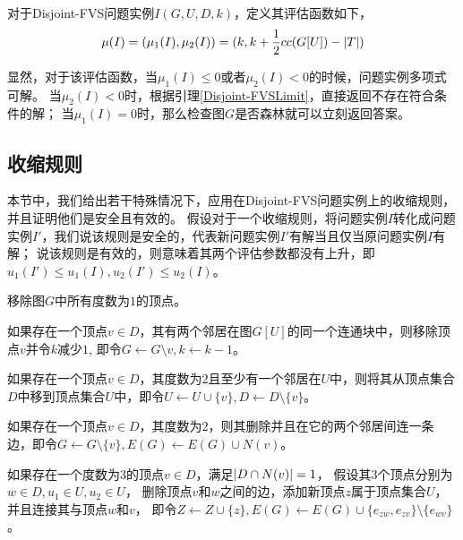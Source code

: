 \begin{definition}
对于Disjoint-FVS问题实例$I(G, U, D, k)$，定义其评估函数如下，
\[\mu(I) = (\mu_1(I), \mu_2(I)) = (k, k + \frac{1}{2}cc(G[U]) - \left\vert T \right\vert)\]
\end{definition}

显然，对于该评估函数，当$\mu_1(I) \le  0$或者$\mu_2(I) < 0$的时候，问题实例多项式可解。
当$\mu_2(I) < 0$时，根据引理\ref{Disjoint-FVSLimit}，直接返回不存在符合条件的解；
当$\mu_1(I) = 0$时，那么检查图$G$是否森林就可以立刻返回答案。

\subsection{收缩规则}
本节中，我们给出若干特殊情况下，应用在Disjoint-FVS问题实例上的收缩规则，并且证明他们是安全且有效的。
假设对于一个收缩规则，将问题实例$I$转化成问题实例$I'$，我们说该规则是安全的，代表新问题实例$I'$有解当且仅当原问题实例$I$有解；
说该规则是有效的，则意味着其两个评估参数都没有上升，即$u_1(I') \le u_1(I), u_2(I') \le u_2(I)$。 \\

\begin{reducerule}
移除图$G$中所有度数为$1$的顶点。
\end{reducerule}

\begin{reducerule}
如果存在一个顶点$v \in D$，其有两个邻居在图$G[U]$的同一个连通块中，则移除顶点$v$并令$k$减少$1$, 即令$G \leftarrow G \setminus v, k \leftarrow k - 1$。
\end{reducerule}

\begin{reducerule}
如果存在一个顶点$v \in D$，其度数为$2$且至少有一个邻居在$U$中，则将其从顶点集合$D$中移到顶点集合$U$中，即令$U \leftarrow U \cup \{v\}, D \leftarrow D \setminus \{v\}$。
\end{reducerule}

\begin{reducerule}
如果存在一个顶点$v \in D$，其度数为$2$，则其删除并且在它的两个邻居间连一条边，即令$G \leftarrow G \setminus \{v\}, E(G) \leftarrow E(G) \cup N(v)$。
\end{reducerule}


\begin{reducerule}
如果存在一个度数为$3$的顶点$v \in D$，满足$\left\vert D \cap N(v) \right\vert = 1$，
假设其$3$个顶点分别为$w \in D, u_1 \in U, u_2 \in U$，
删除顶点$v$和$w$之间的边，添加新顶点$z$属于顶点集合$U$，并且连接其与顶点$w$和$v$，
即令$Z \leftarrow Z \cup \{z\}, E(G) \leftarrow E(G) \cup \{e_{zw}, e_{zv}\} \setminus \{e_{wv}\}$。
\end{reducerule}


